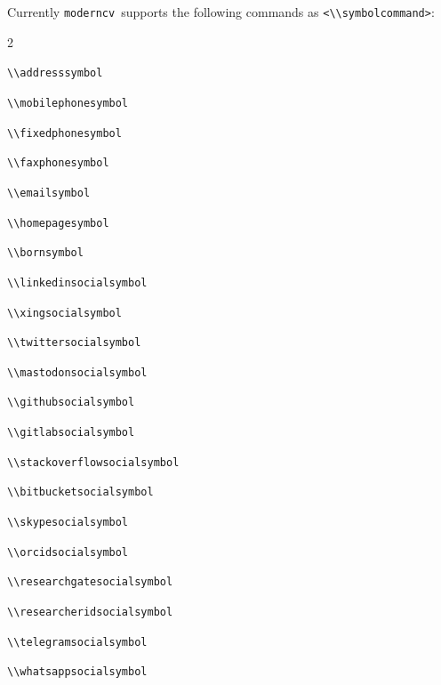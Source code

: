 \documentclass[a4paper, 11pt]{article}
\newcommand{\code}[1]{\lstinline!#1!}
\newcommand{\moderncv}{\code{moderncv}}
\newcommand{\Moderncv}{\moderncv~}
\begin{document}
Currently \Moderncv supports the following commands as \code{<\\symbolcommand>}:
\begin{itemize}
  \begin{multicols}{2}
    \item \code{\\addresssymbol}
    \item \code{\\mobilephonesymbol}
    \item \code{\\fixedphonesymbol}
    \item \code{\\faxphonesymbol}
    \item \code{\\emailsymbol}
    \item \code{\\homepagesymbol}
    \item \code{\\bornsymbol}
    \item \code{\\linkedinsocialsymbol}
    \item \code{\\xingsocialsymbol}
    \item \code{\\twittersocialsymbol}
    \item \code{\\mastodonsocialsymbol}
    \item \code{\\githubsocialsymbol}
    \item \code{\\gitlabsocialsymbol}
    \item \code{\\stackoverflowsocialsymbol}
    \item \code{\\bitbucketsocialsymbol}
    \item \code{\\skypesocialsymbol}
    \item \code{\\orcidsocialsymbol}
    \item \code{\\researchgatesocialsymbol}
    \item \code{\\researcheridsocialsymbol}
    \item \code{\\telegramsocialsymbol}
    \item \code{\\whatsappsocialsymbol}

\end{multicols}
\end{itemize}
\end{document}
